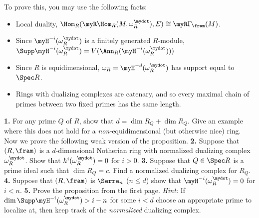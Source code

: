 \documentclass[12pt]{amsart}
\numberwithin{equation}{theorem}
\renewcommand{\:}{\colon}
\theoremstyle{theorem}
\begin{document}
To prove this, you may use the following facts:
\begin{itemize}
\item{} Local duality, $\Hom_R(\myR \Hom_R(M, \omega_R^{\mydot}), E) \cong \myR \Gamma_{\fram}(M)$.
\item{} Since $\myH^{-i}(\omega_R^{\mydot})$ is a finitely generated $R$-module, $\Supp \myH^{-i}(\omega_R^{\mydot}) = V(\Ann_R(\myH^{-i}(\omega_R^{\mydot})))$
\item{} Since $R$ is equidimensional, $\omega_R = \myH^{-d}(\omega_R^{\mydot})$ has support equal to $\Spec R$.
\item{} Rings with dualizing complexes are catenary, and so every maximal chain of primes between two fixed primes has the same length.
\end{itemize}
\noindent
{\bf 1.}  For any prime $Q$ of $R$, show that $d = \dim R_Q + \dim R_Q$.  Give an example where this does not hold for a \emph{non-}equidimensional (but otherwise nice) ring.
\vskip 150pt
Now we prove the following weak version of the proposition.
\vskip 3pt
\noindent
{\bf 2.}  Suppose that $(R, \fram)$ is a $d$-dimensional Notherian ring with normalized dualizing complex $\omega_R^{\mydot}$.  Show that $h^{i}(\omega_R^{\mydot}) = 0$ for $i > 0$.
\newpage
\noindent
{\bf 3.}  Suppose that $Q \in \Spec R$ is a prime ideal such that $\dim R_Q = c$.  Find a normalized dualizing complex for $R_Q$.
\vskip 80pt
\noindent
{\bf 4.}  Suppose that $(R, \fram)$ is $\Serre_n$ ($n \leq d$) show that $\myH^{-i}(\omega_R^{\mydot}) = 0$ for $i < n$.
\vskip 125pt
\noindent
{\bf 5.}  Prove the proposition from the first page.
\vskip 3pt
\emph{Hint:} If $\dim \Supp \myH^{-i}(\omega_R^{\mydot}) > i - n$ for some $i < d$ choose an appropriate prime to localize at, then keep track of the \emph{normalized} dualizing complex.  
\end{document}
